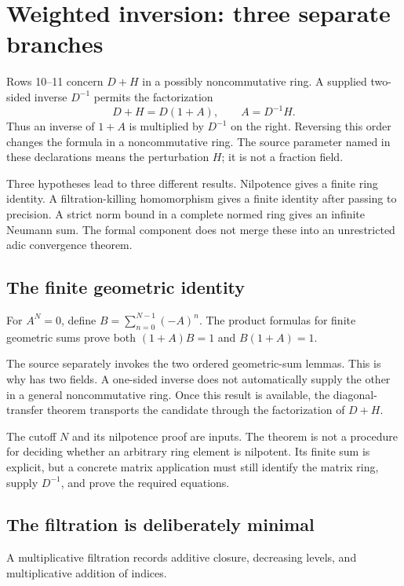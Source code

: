 \section{Weighted inversion: three separate branches}\label{sec:weighted}

Rows 10--11 concern $D+H$ in a possibly noncommutative ring. A supplied two-sided inverse $D^{-1}$ permits the factorization
\[
D+H=D(1+A),\qquad A=D^{-1}H.
\]
Thus an inverse of $1+A$ is multiplied by $D^{-1}$ on the right. Reversing this order changes the formula in a noncommutative ring. The source parameter named  in these declarations means the perturbation $H$; it is not a fraction field.

Three hypotheses lead to three different results. Nilpotence gives a finite ring identity. A filtration-killing homomorphism gives a finite identity after passing to precision. A strict norm bound in a complete normed ring gives an infinite Neumann sum. The formal component does not merge these into an unrestricted adic convergence theorem.

\subsection{The finite geometric identity}

For $A^N=0$, define $B=\sum_{n=0}^{N-1}(-A)^n$. The product formulas for finite geometric sums prove both $(1+A)B=1$ and $B(1+A)=1$.

The source separately invokes the two ordered geometric-sum lemmas. This is why  has two fields. A one-sided inverse does not automatically supply the other in a general noncommutative ring. Once this result is available, the diagonal-transfer theorem transports the candidate through the factorization of $D+H$.

The cutoff $N$ and its nilpotence proof are inputs. The theorem is not a procedure for deciding whether an arbitrary ring element is nilpotent. Its finite sum is explicit, but a concrete matrix application must still identify the matrix ring, supply $D^{-1}$, and prove the required equations.

\subsection{The filtration is deliberately minimal}

A multiplicative filtration records additive closure, decreasing levels, and multiplicative addition of indices.

